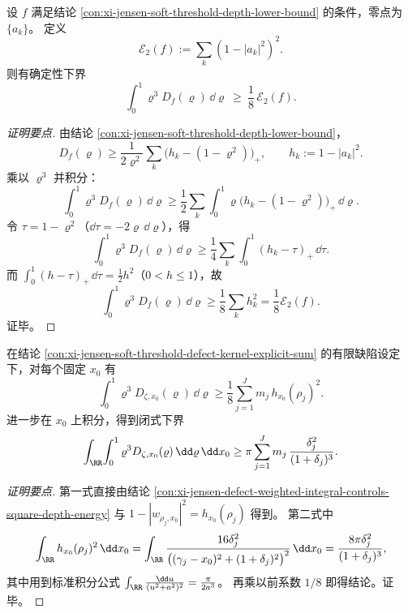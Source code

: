 \begin{conclusion}\label{con:xi-jensen-defect-weighted-integral-controls-square-depth-energy}
设 \(f\) 满足结论 \ref{con:xi-jensen-soft-threshold-depth-lower-bound} 的条件，零点为 \(\{a_k\}\)。
定义
\[
\mathcal E_2(f):=\sum_k(1-|a_k|^2)^2.
\]
则有确定性下界
\[
\int_0^1\varrho^3D_f(\varrho)\,\dd\varrho\ \ge\ \frac18\,\mathcal E_2(f).
\]
\end{conclusion}
\begin{proof}[证明要点]
由结论 \ref{con:xi-jensen-soft-threshold-depth-lower-bound}，
\[
D_f(\varrho)\ge \frac1{2\varrho^2}\sum_k\bigl(h_k-(1-\varrho^2)\bigr)_+,\qquad h_k:=1-|a_k|^2.
\]
乘以 \(\varrho^3\) 并积分：
\[
\int_0^1\varrho^3D_f(\varrho)\,\dd\varrho
\ge
\frac12\sum_k\int_0^1\varrho\bigl(h_k-(1-\varrho^2)\bigr)_+\,\dd\varrho.
\]
令 \(\tau=1-\varrho^2\)（\(\dd\tau=-2\varrho\,\dd\varrho\)），得
\[
\int_0^1\varrho^3D_f(\varrho)\,\dd\varrho
\ge
\frac14\sum_k\int_0^1(h_k-\tau)_+\,\dd\tau.
\]
而 \(\int_0^1(h-\tau)_+\,\dd\tau=\frac12h^2\)（\(0<h\le 1\)），故
\[
\int_0^1\varrho^3D_f(\varrho)\,\dd\varrho
\ge
\frac18\sum_k h_k^2
=\frac18\mathcal E_2(f).
\]
证毕。
\end{proof}

\begin{conclusion}\label{con:xi-jensen-defect-second-order-tomography-closed-lower-bound}
在结论 \ref{con:xi-jensen-soft-threshold-defect-kernel-explicit-sum} 的有限缺陷设定下，对每个固定 \(x_0\) 有
\[
\int_0^1\varrho^3D_{\zeta,x_0}(\varrho)\,\dd\varrho
\ge
\frac18\sum_{j=1}^{J}m_j\,h_{x_0}(\rho_j)^2.
\]
进一步在 \(x_0\) 上积分，得到闭式下界
\[
\int_{\RR}\!\int_0^1\varrho^3D_{\zeta,x_0}(\varrho)\,\dd\varrho\,\dd x_0
\ge
\pi\sum_{j=1}^{J}m_j\,\frac{\delta_j^2}{(1+\delta_j)^3}.
\]
\end{conclusion}
\begin{proof}[证明要点]
第一式直接由结论 \ref{con:xi-jensen-defect-weighted-integral-controls-square-depth-energy}
与 \(1-|w_{\rho_j,x_0}|^2=h_{x_0}(\rho_j)\) 得到。
第二式中
\[
\int_{\RR}h_{x_0}(\rho_j)^2\,\dd x_0
=
\int_{\RR}
\frac{16\delta_j^2}{\bigl((\gamma_j-x_0)^2+(1+\delta_j)^2\bigr)^2}\,\dd x_0
=
\frac{8\pi\delta_j^2}{(1+\delta_j)^3},
\]
其中用到标准积分公式
\(
\int_{\RR}\frac{\dd u}{(u^2+a^2)^2}=\frac{\pi}{2a^3}
\)。
再乘以前系数 \(1/8\) 即得结论。证毕。
\end{proof}

